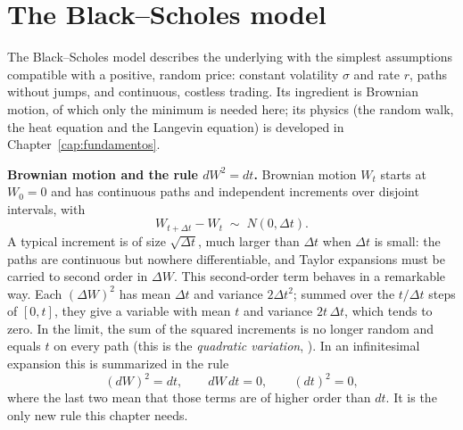 \section{The Black--Scholes model}\label{sec:modelo_bs}

The Black--Scholes model describes the underlying with the simplest
assumptions compatible with a positive, random price: constant
volatility $\sigma$ and rate $r$, paths without jumps, and continuous,
costless trading. Its ingredient is Brownian motion, of which only the
minimum is needed here; its physics (the random walk, the heat equation
and the Langevin equation) is developed in
Chapter~\ref{cap:fundamentos}\enprep.

\medskip

\noindent\textbf{Brownian motion and the rule $dW^2 = dt$.}
Brownian motion $W_t$ starts at $W_0 = 0$ and has continuous paths and
independent increments over disjoint intervals, with
\begin{equation}\label{eq:incremento_browniano}
  W_{t + \Delta t} - W_t \;\sim\; N(0, \Delta t).
\end{equation}
A typical increment is of size $\sqrt{\Delta t}$, much larger than
$\Delta t$ when $\Delta t$ is small: the paths are continuous but
nowhere differentiable, and Taylor expansions must be carried to second
order in $\Delta W$. This second-order term behaves in a remarkable way.
Each $(\Delta W)^2$ has mean $\Delta t$ and variance $2\Delta t^2$;
summed over the $t/\Delta t$ steps of $[0, t]$, they give a variable
with mean $t$ and variance $2t\,\Delta t$, which tends to zero. In the
limit, the sum of the squared increments is no longer random and equals
$t$ on every path (this is the \emph{quadratic variation},
\cite[Section~3.2.3]{tfgm}). In an infinitesimal expansion this is
summarized in the rule
\begin{equation}\label{eq:regla_dW2}
  (dW)^2 = dt, \qquad dW\, dt = 0, \qquad (dt)^2 = 0,
\end{equation}
where the last two mean that those terms are of higher order than $dt$.
It is the only new rule this chapter needs.

\medskip


